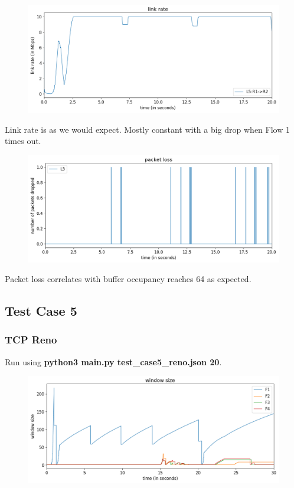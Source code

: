 \documentclass{article}
\begin{document}
\begin{figure}[H]
\centering
\includegraphics[width = \textwidth]{test_case4 link rate.png}
\end{figure}

Link rate is as we would expect. Mostly constant with a big drop when Flow 1 times out.

\begin{figure}[H]
\centering
\includegraphics[width = \textwidth]{test_case4 packet loss.png}
\end{figure}

Packet loss correlates with buffer occupancy reaches 64 as expected.



\subsection{Test Case 5}

\subsubsection{TCP Reno}

Run using \textbf{python3 main.py test\_case5\_reno.json 20}.

\begin{figure}[H]
\centering
\includegraphics[width = \textwidth]{test_case5_reno window size.png}
\end{figure}
\end{document}
